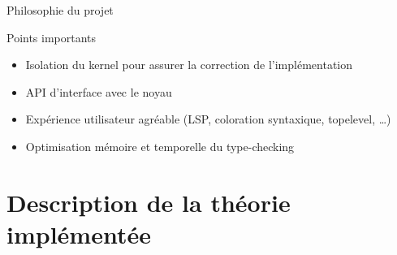 \documentclass[12pt, aspectratio=169]{beamer}
\begin{document}
        \begin{frame}{Philosophie du projet}
            
            \begin{alertblock}{Points importants}
                
                \begin{itemize}
                    \item Isolation du kernel pour assurer la correction de l'implémentation \pause
                    \item API d'interface avec le noyau \pause
                    \item Expérience utilisateur agréable (LSP, coloration syntaxique, topelevel, \dots) \pause
                    \item Optimisation mémoire et temporelle du type-checking
                \end{itemize}

            \end{alertblock}

        \end{frame}

    \section{Description de la théorie implémentée}
\end{document}
